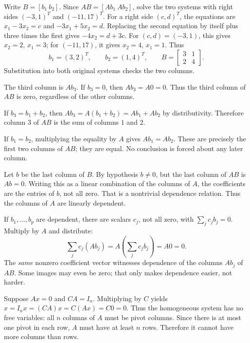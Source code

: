 Write $B=[b_1\ b_2]$. Since $AB=[Ab_1\ Ab_2]$, solve the two systems
with right sides $(-3,1)^T$ and $(-11,17)^T$.
For a right side $(c,d)^T$, the equations are
$x_1-3x_2=c$ and $-3x_1+5x_2=d$.
Replacing the second equation by itself plus three times the first gives
$-4x_2=d+3c$. For $(c,d)=(-3,1)$, this gives $x_2=2$, $x_1=3$;
for $(-11,17)$, it gives $x_2=4$, $x_1=1$. Thus
\[
 b_1=(3,2)^T,\qquad b_2=(1,4)^T,\qquad
 B=\begin{bmatrix}3&1\\2&4\end{bmatrix}.
\]
Substitution into both original systems checks the two columns.

The third column is $Ab_3$. If $b_3=0$, then $Ab_3=A0=0$.
Thus the third column of $AB$ is zero, regardless of the other columns.

If $b_3=b_1+b_2$, then
$Ab_3=A(b_1+b_2)=Ab_1+Ab_2$ by distributivity.
Therefore column $3$ of $AB$ is the sum of columns $1$ and $2$.

If $b_1=b_2$, multiplying the equality by $A$ gives $Ab_1=Ab_2$.
These are precisely the first two columns of $AB$; they are equal.
No conclusion is forced about any later column.

Let $b$ be the last column of $B$. By hypothesis $b\ne0$, but the
last column of $AB$ is $Ab=0$. Writing this as a linear combination of
the columns of $A$, the coefficients are the entries of $b$, not all zero.
That is a nontrivial dependence relation. Thus the columns of $A$ are
linearly dependent.

If $b_1,\ldots,b_p$ are dependent, there are scalars $c_j$, not all zero,
with $\sum_j c_jb_j=0$. Multiply by $A$ and distribute:
\[
 \sum_j c_j(Ab_j)=A\left(\sum_j c_jb_j\right)=A0=0.
\]
The \emph{same} nonzero coefficient vector witnesses dependence of the
columns $Ab_j$ of $AB$. Some images may even be zero; that only makes
dependence easier, not harder.

Suppose $Ax=0$ and $CA=I_n$. Multiplying by $C$ yields
$x=I_nx=(CA)x=C(Ax)=C0=0$.
Thus the homogeneous system has no free variables: all $n$ columns of $A$
must be pivot columns. Since there is at most one pivot in each row,
$A$ must have at least $n$ rows. Therefore it cannot have more columns
than rows.

